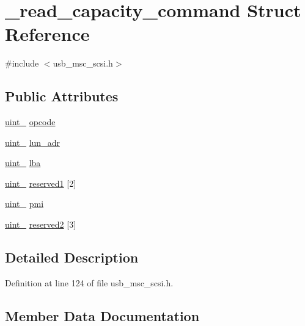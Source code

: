 \hypertarget{struct__read__capacity__command}{}\section{\+\_\+read\+\_\+capacity\+\_\+command Struct Reference}
\label{struct__read__capacity__command}


{\ttfamily \#include $<$usb\+\_\+msc\+\_\+scsi.\+h$>$}

\subsection*{Public Attributes}
\begin{DoxyCompactItemize}
\item 
\hyperlink{types_8h_ad3209046c23f739a81581c10a4be7d92}{uint\+\_} \hyperlink{struct__read__capacity__command_a3944b61382b5de9d96721c4655400281}{opcode}
\item 
\hyperlink{types_8h_ad3209046c23f739a81581c10a4be7d92}{uint\+\_} \hyperlink{struct__read__capacity__command_a07f900836b59019ddb9e0ec3da86570f}{lun\+\_\+adr}
\item 
\hyperlink{types_8h_a5532400b872b4aa84e54335bf458a318}{uint\+\_} \hyperlink{struct__read__capacity__command_af0c94df99856ae0ead78159935685767}{lba}
\item 
\hyperlink{types_8h_ad3209046c23f739a81581c10a4be7d92}{uint\+\_} \hyperlink{struct__read__capacity__command_a5e9e4e741d86e941953901fa9da22ea0}{reserved1} \mbox{[}2\mbox{]}
\item 
\hyperlink{types_8h_ad3209046c23f739a81581c10a4be7d92}{uint\+\_} \hyperlink{struct__read__capacity__command_a0b714cbd72937fa715e5e1a838102ed6}{pmi}
\item 
\hyperlink{types_8h_ad3209046c23f739a81581c10a4be7d92}{uint\+\_} \hyperlink{struct__read__capacity__command_ab762a655b0bff68a871acc459dad4a0c}{reserved2} \mbox{[}3\mbox{]}
\end{DoxyCompactItemize}


\subsection{Detailed Description}


Definition at line 124 of file usb\+\_\+msc\+\_\+scsi.\+h.



\subsection{Member Data Documentation}
